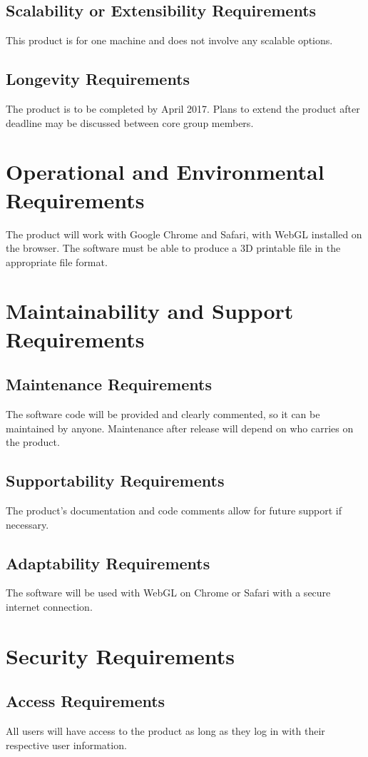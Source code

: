 \documentclass{report}
\begin{document}
\subsection{Scalability or Extensibility Requirements}
This product is for one machine and does not involve any scalable options.
\subsection{Longevity Requirements}
The product is to be completed by April 2017.  Plans to extend the product after deadline may be discussed between core group members.

\section{Operational and Environmental Requirements}
The product will work with Google Chrome and Safari, with WebGL installed on the browser.  The software must be able to produce a 3D printable file in the appropriate file format.
\section{Maintainability and Support Requirements}
\subsection{Maintenance Requirements}
The software code will be provided and clearly commented, so it can be maintained by anyone.  Maintenance after release will depend on who carries on the product.
\subsection{Supportability Requirements}
The product's documentation and code comments allow for future support if necessary.
\subsection{Adaptability Requirements}
The software will be used with WebGL on Chrome or Safari with a secure internet connection.
\section{Security Requirements}
\subsection{Access Requirements}
All users will have access to the product as long as they log in with their respective user information.
\end{document}
